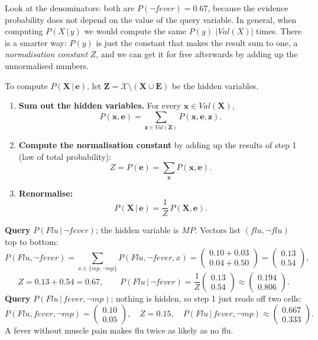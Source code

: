 \documentclass[11pt, oneside]{book}
\newcommand{\Prob}{\mathbb{P}}           %
\newcommand{\given}{\,\vert\,}           %
\newcommand{\Val}{\mathit{Val}}          %
\newcommand{\Xall}{\mathcal{X}}          %
\newcommand{\bX}{\mathbf{X}}  \newcommand{\bY}{\mathbf{Y}}
\newcommand{\bZ}{\mathbf{Z}}  \newcommand{\bE}{\mathbf{E}}
\newcommand{\bx}{\mathbf{x}}  \newcommand{\by}{\mathbf{y}}
\newcommand{\bz}{\mathbf{z}}  \newcommand{\be}{\mathbf{e}}
\newcommand{\vn}[1]{\mathit{#1}}         %
\begin{document}
Look at the denominators: both are $P(\neg\vn{fever}) = 0.67$, because the
evidence probability does not depend on the value of the query variable. In
general, when computing $P(X \given y)$ we would compute the same $P(y)$
$|\Val(X)|$ times. There is a smarter way: $P(y)$ is just the constant that
makes the result sum to one, a \emph{normalisation constant} $Z$, and we can
get it for free afterwards by adding up the unnormalised numbers.

\begin{thmbox}[title={Inference by enumeration}, unbreakable]
To compute $P(\bX \given \be)$, let $\bZ = \Xall \setminus (\bX \cup \bE)$ be the
hidden variables.
\begin{enumerate}
  \item \textbf{Sum out the hidden variables.} For every $\bx \in \Val(\bX)$,
    \[ P(\bx, \be) = \sum_{\bz \in \Val(\bZ)} P(\bx, \be, \bz). \]
  \item \textbf{Compute the normalisation constant} by adding up the results
    of step 1 (law of total probability):
    \[ Z = P(\be) = \sum_{\bx} P(\bx, \be). \]
  \item \textbf{Renormalise:}
    \[ P(\bX \given \be) = \frac{1}{Z}\, P(\bX, \be). \]
\end{enumerate}
\end{thmbox}

\begin{exbox}[title={Two queries, step by step}]
\textbf{Query} $P(\vn{Flu} \given \neg\vn{fever})$; the hidden variable is
$\vn{MP}$. Vectors list $(\vn{flu}, \neg\vn{flu})$ top to bottom:
\[
P(\vn{Flu}, \neg\vn{fever}) = \sum_{x \in \{\vn{mp}, \neg\vn{mp}\}}
P(\vn{Flu}, \neg\vn{fever}, x)
= \begin{pmatrix} 0.10 + 0.03 \\ 0.04 + 0.50 \end{pmatrix}
= \begin{pmatrix} 0.13 \\ 0.54 \end{pmatrix},
\]
\[
Z = 0.13 + 0.54 = 0.67,
\qquad P(\vn{Flu} \given \neg\vn{fever}) = \frac{1}{Z}
\begin{pmatrix} 0.13 \\ 0.54 \end{pmatrix} \approx
\begin{pmatrix} 0.194 \\ 0.806 \end{pmatrix}.
\]
\textbf{Query} $P(\vn{Flu} \given \vn{fever}, \neg\vn{mp})$; nothing is hidden,
so step 1 just reads off two cells:
\[
P(\vn{Flu}, \vn{fever}, \neg\vn{mp}) = \begin{pmatrix} 0.10 \\ 0.05 \end{pmatrix},
\quad Z = 0.15,
\quad P(\vn{Flu} \given \vn{fever}, \neg\vn{mp}) \approx
\begin{pmatrix} 0.667 \\ 0.333 \end{pmatrix}.
\]
A fever without muscle pain makes flu twice as likely as no flu.
\end{exbox}
\end{document}
